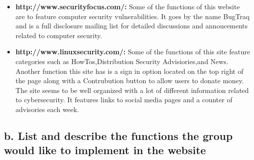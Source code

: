 \documentclass{article}
\begin{document}
\begin{itemize}
    \item %
    \textbf{http://www.securityfocus.com/:} 
    Some of the functions of this website are to feature computer security vulnerabilities. It goes by the name BugTraq and is a full disclosure mailing list
    for detailed discussions and annoucements related to computer security.
    \item %
    \textbf{http://www.linuxsecurity.com/:}
    Some of the functions of this site feature categories such as HowTos,Distribution Security Advisiories,and News.
         Another function this site has is a sign in option located on the top right of the page along with a Contrubution button to allow users to donate money.
         The site seems to be well organized with a lot of different information related to cybersecurity. 
         It features links to social media pages and a counter of advisories each week.
\end{itemize}



\subsection{b. List and describe the functions the group would like to implement in the website}
\end{document}
